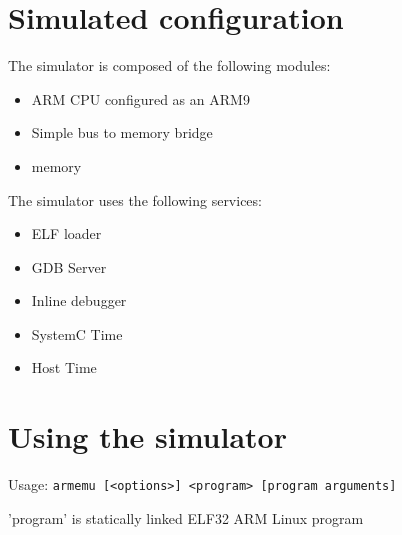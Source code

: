\section{Simulated configuration}

The simulator is composed of the following modules:
\begin{itemize}\addtolength{\itemsep}{-0.40\baselineskip}
\item ARM CPU configured as an ARM9
\item Simple bus to memory bridge
\item memory
\end{itemize}

The simulator uses the following services:
\begin{itemize}\addtolength{\itemsep}{-0.40\baselineskip}
\item ELF loader
\item GDB Server
\item Inline debugger
\item SystemC Time
\item Host Time
\end{itemize}

\section{Using the simulator}

Usage: \texttt{armemu [<options>] <program> [program arguments]}

     'program' is statically linked ELF32 ARM Linux program

